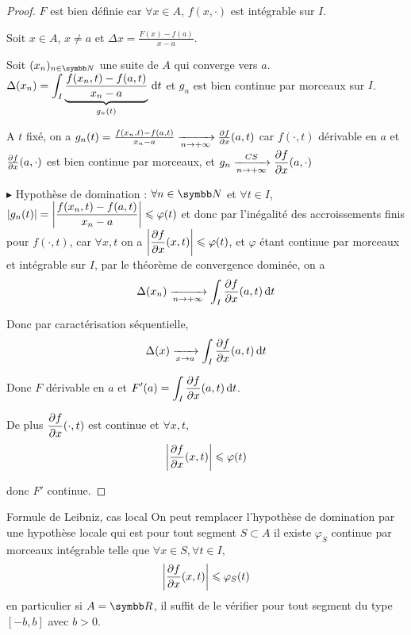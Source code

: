 \begin{proof}
    $F$ est bien définie car $\forall x \in A$, $f(x, \cdot)$ est intégrable sur $I$.

    Soit $x \in A$, $x \neq a$ et $\Delta x = \frac{F(x) - f(a)}{x - a }$.

    Soit $(x_n)_{n \in \N}$ une suite de $A$ qui converge vers $a$. 
    $\Delta(x_n) = \displaystyle \int_I \underbrace{\frac{f(x_n, t) - f(a, t)}{x_n - a }}_{g_n(t)} \,\mathrm{d}t$
    et $g_n$ est bien continue par morceaux sur $I$. 

    A $t$ fixé, on a $g_n(t) = \frac{f(x_n, t) - f(a, t)}{x_n - a } \xrightarrow[n \to + \infty]{} \frac{\partial f}{\partial x} (a, t)$
    car $f(\cdot, t)$ dérivable en $a$ et $\frac{\partial f}{\partial x} (a, \cdot)$ est bien continue par morceaux, et $ \displaystyle g_n \xrightarrow[n \to + \infty]{CS} \frac{\partial f}{\partial x} (a, \cdot)$


    \avspace $\blacktriangleright$ Hypothèse de domination : $\forall n \in \N$ et $\forall t \in I$, 
    $\displaystyle |g_n(t)| = \left| \frac{f(x_n, t) - f(a, t)}{x_n - a } \right| \leqslant \varphi(t)$ et 
    donc par l'inégalité des accroissements finis pour $f(\cdot, t)$, car $\forall x, t$ on a $\displaystyle \left| \frac{\partial f}{\partial x} (x, t) \right| \leqslant \varphi(t)$, 
    et $\varphi$ étant continue par morceaux et intégrable sur $I$, par le théorème de convergence dominée, on a
    $$\Delta(x_n) \xrightarrow[n \to + \infty]{} \int_I \frac{\partial f}{\partial x} (a, t) \,\mathrm{d}t$$

    Donc par caractérisation séquentielle, 
    $$\Delta(x) \xrightarrow[x \to a]{} \int_I \frac{\partial f}{\partial x} (a, t) \,\mathrm{d}t$$

    Donc $F$ dérivable en $a$ et $\displaystyle F'(a) = \int_I \frac{\partial f}{\partial x} (a, t) \,\mathrm{d}t$.

    De plus $\displaystyle \frac{\partial f}{\partial x} (\cdot, t)$ est continue et $\forall x, t$, 
    $$\left| \frac{\partial f}{\partial x} (x, t) \right| \leqslant \varphi(t)$$

    donc $F'$ continue. 
\end{proof}

\begin{theoreme}{Formule de Leibniz, cas local}{}
    On peut remplacer l'hypothèse de domination par une hypothèse locale qui est pour tout segment 
    $S \subset A$ il existe $\varphi_S$ continue par morceaux intégrable telle que 
    $\forall x \in S, \forall t \in I$,
    $$\left| \frac{\partial f}{\partial x} (x, t) \right| \leqslant \varphi_S(t)$$
    en particulier si $A = \R$, il suffit de le vérifier pour tout segment du type $[-b, b]$ avec $b > 0$.
\end{theoreme}

